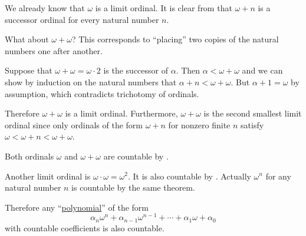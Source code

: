 \begin{example}\label{ex:countable_limit_ordinals}
  We already know that \( \omega \) is a limit ordinal. It is clear from  that \( \omega + n \) is a successor ordinal for every natural number \( n \).

  What about \( \omega + \omega \)? This corresponds to \enquote{placing} two copies of the natural numbers one after another.

  Suppose that \( \omega + \omega = \omega \cdot 2 \) is the successor of \( \alpha \). Then \( \alpha < \omega + \omega \) and we can show by induction on the natural numbers that \( \alpha + n < \omega + \omega \). But \( \alpha + 1 = \omega \) by assumption, which contradicts trichotomy of ordinals.

  Therefore \( \omega + \omega \) is a limit ordinal. Furthermore, \( \omega + \omega \) is the second smallest limit ordinal since only ordinals of the form \( \omega + n \) for nonzero finite \( n \) satisfy \( \omega < \omega + n < \omega + \omega \).

  Both ordinals \( \omega \) and \( \omega + \omega \) are countable by .

  Another limit ordinal is \( \omega \cdot \omega = \omega^2 \). It is also countable by . Actually \( \omega^n \) for any natural number \( n \) is countable by the same theorem.

  Therefore any \enquote{\hyperref[def:polynomial]{polynomial}} of the form
  \begin{equation*}
    \alpha_n \omega^n + \alpha_{n-1} \omega^{n-1} + \cdots + \alpha_1 \omega + \alpha_0
  \end{equation*}
  with countable coefficients is also countable.
\end{example}

